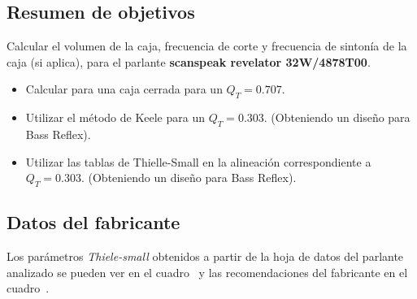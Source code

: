 
\subsection{Resumen de objetivos}


\normalfont

Calcular el volumen de la caja, frecuencia de corte y frecuencia de sintonía de la caja (si aplica), para el parlante \textbf{scanspeak revelator 32W/4878T00}.



\begin{itemize}
\item Calcular para una caja cerrada para un $Q_{T} = 0.707$.
\item Utilizar el método de Keele para un $Q_{T} = 0.303$. (Obteniendo un diseño para Bass Reflex).
\item Utilizar las tablas de Thielle-Small en la alineación correspondiente a $Q_{T} = 0.303$. (Obteniendo un diseño para Bass Reflex).
\end{itemize}





\subsection{Datos del fabricante}


Los parámetros \textit{Thiele-small} obtenidos a partir de la hoja de datos del parlante analizado se pueden ver en el cuadro~ y las recomendaciones del fabricante en el cuadro~.


 
